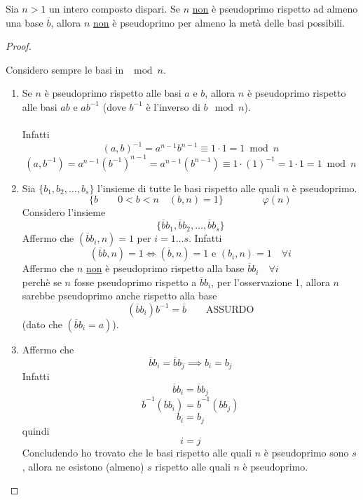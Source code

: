 \documentclass[a4paper,12pt, oneside]{book}
\begin{document}
				\begin{teorema}
					Sia $n>1$ un intero composto dispari.
					Se $n$ \underline{non} è pseudoprimo rispetto ad almeno una base $\overline{b}$, allora $n$ \underline{non} è pseudoprimo per almeno la metà delle basi possibili.
					
					\begin{proof}
						\begin{nota}
							Considero sempre le basi in $\mod n$.
						\end{nota}
						\begin{enumerate}
							\item Se $n$ è pseudoprimo rispetto alle basi $a$ e $b$, allora $n$ è pseudoprimo rispetto alle basi $ab$ e $ab^{-1}$ (dove $b^{-1}$ è l'inverso di $b \mod n$).\\\\
							Infatti
							$$(a,b)^{-1} = a^{n-1} b^{n-1} \equiv 1 \cdot 1 = 1 \bmod n$$
							$$(a,b^{-1}) = a^{n-1} (b^{-1})^{n-1} = a^{n-1} (b^{n-1}) \equiv 1 \cdot (1)^{-1} = 1 \cdot 1 = 1 \bmod n$$
							
							\item Sia $\{ b_1, b_2, \dots , b_s \}$ l'insieme di tutte le basi rispetto alle quali $n$ è pseudoprimo.
							$$\{ b \qquad 0<b<n \quad (b,n)=1 \} \qquad\qquad \varphi(n)$$
							Considero l'insieme $$\{ \overline{b}b_1, \overline{b}b_2, \dots, \overline{b}b_s \}$$
							Affermo che $(\overline{b}b_i, n) =1$ per $i=1 \dots s$. Infatti
							$$(\overline{b}b, n)=1 \iff (\overline{b},n) =1 \mbox{ e } (b_i,n)=1 \quad \forall i$$
							Affermo che $n$ \underline{non} è pseudoprimo rispetto alla base $\overline{b}b_i \quad \forall i$\\
							perchè se $n$ fosse pseudoprimo rispetto a $\overline{b}b_i$, per l'osservazione 1, allora $n$ sarebbe pseudoprimo anche rispetto alla base
							$$(\overline{b}b_i) b^{-1} = \overline{b} \qquad \mbox{ASSURDO}$$
							(dato che $(\overline{b}b_i = a)$).
							
							\item Affermo che 
							$$\overline{b}b_i = \overline{b}b_j \implies b_i = b_j$$
							Infatti
							$$\overline{b}b_i = \overline{b}b_j$$
							$$\overline{b}^{-1}(\overline{b}b_i) = \overline{b}^{-1}(\overline{b}b_j)$$
							$$b_i = b_j$$
							quindi
							$$i=j$$
							Concludendo ho trovato che le basi rispetto alle quali $n$ è pseudoprimo sono $s$, allora ne esistono (almeno) $s$ rispetto alle quali $n$ è pseudoprimo.
						\end{enumerate}
					\end{proof}
				\end{teorema}
			
\end{document}
